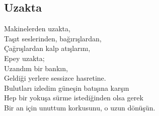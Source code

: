 \subsection{Uzakta}

Makinelerden uzakta, \\
Taşıt seslerinden, bağırışlardan, \\
Çağrışlardan kalp atışlarını, \\
Epey uzakta; \\
Uzandım bir bankın, \\
Geldiği yerlere sessizce hasretine. \\
Bulutları izledim güneşin batışına karşın \\
Hep bir yokuşa sürme istediğinden olsa gerek \\
Bir an için unuttum korkusunu, o uzun dönüşün.